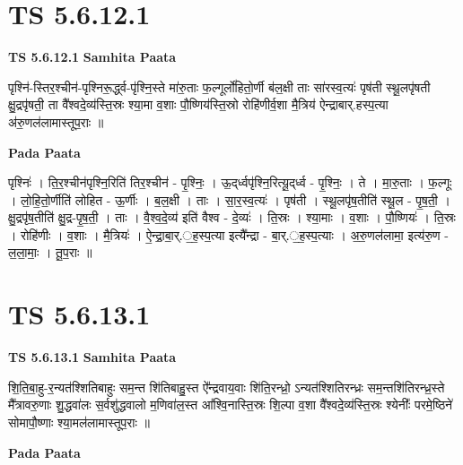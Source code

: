 \documentclass[17pt]{extarticle}
\begin{document}

\section{ TS 5.6.12.1 }

\textbf{TS 5.6.12.1 } \newline
\textbf{Samhita Paata} \newline

पृश्नि॑-स्तिर॒श्चीन॑-पृश्निरू॒र्द्ध्व-पृ॑श्नि॒स्ते मा॑रु॒ताः फ॒ल्गूर्लो॑हितो॒र्णी ब॑ल॒क्षी ताः सा॑रस्व॒त्यः॑ पृष॑ती स्थू॒लपृ॑षती क्षु॒द्रपृ॑षती॒ ता वै᳚श्वदे॒व्य॑स्ति॒स्रः श्या॒मा व॒शाः पौ॒ष्णिय॑स्ति॒स्रो रोहि॑णीर्व॒शा मै॒त्रिय॑ ऐन्द्राबार्.हस्प॒त्या अ॑रु॒णल॑लामास्तूप॒राः ॥ \newline

\textbf{Pada Paata} \newline

पृश्निः॑ । ति॒र॒श्चीन॑पृश्नि॒रिति॑ तिर॒श्चीन॑ - पृ॒श्निः॒ । ऊ॒द्‌र्ध्वपृ॑श्नि॒रित्यू॒द्‌र्ध्व - पृ॒श्निः॒ । ते । मा॒रु॒ताः । फ॒ल्गूः । लो॒हि॒तो॒र्णीति॑ लोहित - ऊ॒र्णीः । ब॒ल॒क्षी । ताः । सा॒र॒स्व॒त्यः॑ । पृष॑ती । स्थू॒लपृ॑ष॒तीति॑ स्थू॒ल - पृ॒ष॒ती॒ । क्षु॒द्रपृ॑ष॒तीति॑ क्षु॒द्र-पृ॒ष॒ती॒ । ताः । वै॒श्व॒दे॒व्य॑ इति॑ वैश्व - दे॒व्यः॑ । ति॒स्रः । श्या॒माः । व॒शाः । पौ॒ष्णियः॑ । ति॒स्रः । रोहि॑णीः । व॒शाः । मै॒त्रियः॑ । ऐ॒न्द्रा॒बा॒र्.॒ह॒स्प॒त्या इत्यै᳚न्द्रा - बा॒र्.॒ह॒स्प॒त्याः । अ॒रु॒णल॑लामा॒ इत्य॑रु॒ण - ल॒ला॒माः॒ । तू॒प॒राः ॥  \newline





\section{ TS 5.6.13.1 }

\textbf{TS 5.6.13.1 } \newline
\textbf{Samhita Paata} \newline

शि॒ति॒बा॒हु-र॒न्यत॑श्शितिबाहुः सम॒न्त शि॑तिबाहु॒स्त ऐ᳚न्द्रवाय॒वाः शि॑ति॒रन्ध्रो॒ ऽन्यत॑श्शितिरन्ध्रः सम॒न्तशि॑तिरन्ध्र॒स्ते मै᳚त्रावरु॒णाः शु॒द्धवा॑लः स॒र्वशु॑द्धवालो म॒णिवा॑ल॒स्त आ᳚श्वि॒नास्ति॒स्रः शि॒ल्पा व॒शा वै᳚श्वदे॒व्य॑स्ति॒स्रः श्येनीः᳚ परमे॒ष्ठिने॑ सोमापौ॒ष्णाः श्या॒मल॑लामास्तूप॒राः ॥ \newline

\textbf{Pada Paata} \newline
\end{document}
